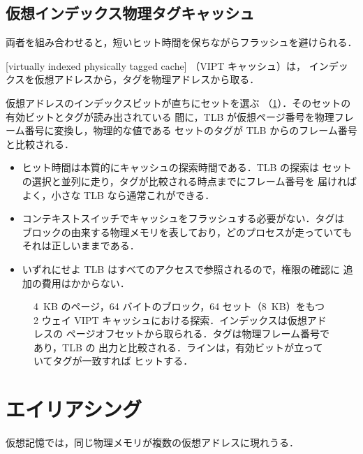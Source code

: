 \documentclass[../main.tex]{subfiles}
\begin{document}
\subsection{仮想インデックス物理タグキャッシュ}

両者を組み合わせると，短いヒット時間を保ちながらフラッシュを避けられる．

\begin{definition}
  [virtually indexed physically tagged cache]%
  （VIPT キャッシュ）は，
  インデックスを仮想アドレスから，タグを物理アドレスから取る．
\end{definition}

仮想アドレスのインデックスビットが直ちにセットを選ぶ
（\cref{fig:l14-vipt}）．そのセットの有効ビットとタグが読み出されている
間に，TLB が仮想ページ番号を物理フレーム番号に変換し，物理的な値である
セットのタグが TLB からのフレーム番号と比較される．
\begin{itemize}
  \item ヒット時間は本質的にキャッシュの探索時間である．TLB の探索は
    セットの選択と並列に走り，タグが比較される時点までにフレーム番号を
    届ければよく，小さな TLB なら通常これができる．
  \item コンテキストスイッチでキャッシュをフラッシュする必要がない．タグは
    ブロックの由来する物理メモリを表しており，どのプロセスが走っていても
    それは正しいままである．
  \item いずれにせよ TLB はすべてのアクセスで参照されるので，権限の確認に
    追加の費用はかからない．
\end{itemize}

\begin{figure}[htbp]
  \centering
  
  \caption{4~KB のページ，64 バイトのブロック，64 セット（8~KB）をもつ 2
    ウェイ VIPT キャッシュにおける探索．インデックスは仮想アドレスの
    ページオフセットから取られる．タグは物理フレーム番号であり，TLB の
    出力と比較される．ラインは，有効ビットが立っていてタグが一致すれば
    ヒットする．}
  \label{fig:l14-vipt}
\end{figure}

\section{エイリアシング}
\label{sec:l14-aliasing}

仮想記憶では，同じ物理メモリが複数の仮想アドレスに現れうる．
\end{document}
